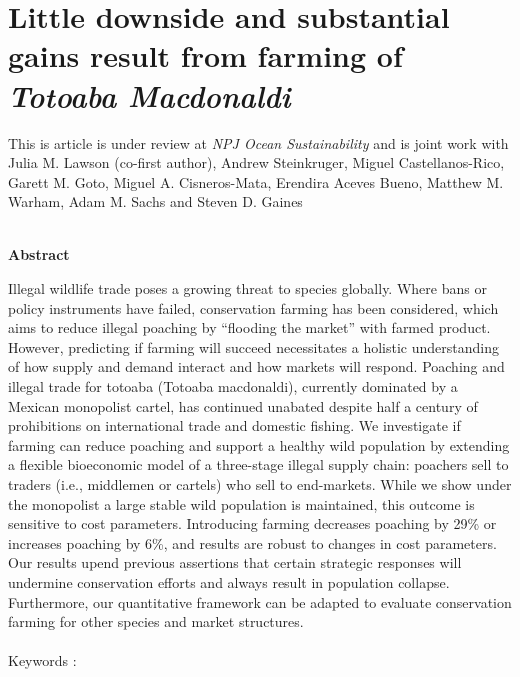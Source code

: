 \chapter{Little downside and substantial gains result from farming of \textit{Totoaba Macdonaldi}}

\begin{center}
\begin{minipage}{0.9\textwidth}
\singlespacing
This is article is under review at \textit{NPJ Ocean Sustainability} and is joint work with Julia M. Lawson (co-first author), Andrew Steinkruger, Miguel Castellanos-Rico, Garett M. Goto, Miguel A. Cisneros-Mata, Erendira Aceves Bueno, Matthew M. Warham, Adam M. Sachs and Steven D. Gaines\\\\
\end{minipage}

\textbf{Abstract}\par
    \vspace*{.2cm}
    \noindent
    \begin{minipage}{0.9\textwidth}
    \singlespacing
Illegal wildlife trade poses a growing threat to species globally. Where bans or policy instruments have failed, conservation farming has been considered, which aims to reduce illegal poaching by “flooding the market” with farmed product. However, predicting if farming will succeed necessitates a holistic understanding of how supply and demand interact and how markets will respond. Poaching and illegal trade for totoaba (Totoaba macdonaldi), currently dominated by a Mexican monopolist cartel, has continued unabated despite half a century of prohibitions on international trade and domestic fishing. We investigate if farming can reduce poaching and support a healthy wild population by extending a flexible bioeconomic model of a three-stage illegal supply chain: poachers sell to traders (i.e., middlemen or cartels) who sell to end-markets. While we show under the monopolist a large stable wild population is maintained, this outcome is sensitive to cost parameters. Introducing farming decreases poaching by 29\% or increases poaching by 6\%, and results are robust to changes in cost parameters. Our results upend previous assertions that certain strategic responses will undermine conservation efforts and always result in population collapse. Furthermore, our quantitative framework can be adapted to evaluate conservation farming for other species and market structures.\\\\
Keywords : 
\end{minipage}
\end{center}
    \vfill


